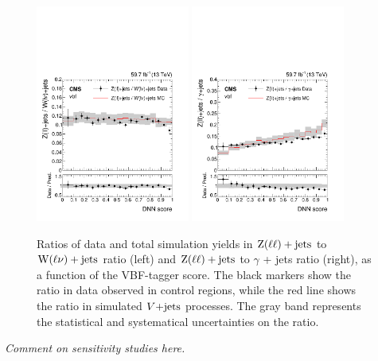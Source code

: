 \begin{figure}[htbp]
    \centering
    \includegraphics[width=0.45\textwidth]{VBFML/combined_combinedW_cat_vbf_2018_2018ratio.pdf}
    \includegraphics[width=0.45\textwidth]{VBFML/combined_gjets_cat_vbf_2018_2018ratio.pdf}
    \caption{Ratios of data and total simulation yields in $\mathrm{Z}(\ell\ell)+\textrm{jets}$ to $\mathrm{W}(\ell\nu)+\textrm{jets}$ ratio (left) and
    $\mathrm{Z}(\ell\ell)+\textrm{jets}$ to $\gamma$ + jets ratio (right), as a function of the VBF-tagger score. The black markers
    show the ratio in data observed in control regions, while the red line shows the ratio in simulated
    $V\text{+jets}$ processes. The gray band represents the statistical and systematical uncertainties on the ratio.}
    \label{fig:cr_ratios_dnn_score}
\end{figure}

\textit{Comment on sensitivity studies here.}
